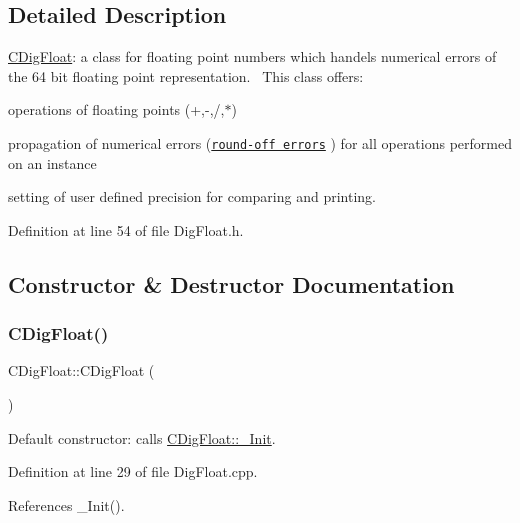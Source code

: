 \subsection{Detailed Description}
\hyperlink{classCDigFloat}{C\+Dig\+Float}\+: a class for floating point numbers which handels numerical errors of the 64 bit floating point representation.~\newline
 This class offers\+: 


\begin{DoxyItemize}
\item operations of floating points (+,-\/,/,$\ast$)
\item propagation of numerical errors (\href{https://en.wikipedia.org/wiki/Round-off_error}{\tt round-\/off errors} ) for all operations performed on an instance
\item setting of user defined precision for comparing and printing. 
\end{DoxyItemize}

Definition at line 54 of file Dig\+Float.\+h.



\subsection{Constructor \& Destructor Documentation}
\mbox{\label{classCDigFloat_ac16694fac9b3b0350f5d02888638ae20}} 
\subsubsection{\texorpdfstring{C\+Dig\+Float()}{CDigFloat()}\hspace{0.1cm}{\footnotesize\ttfamily [1/3]}}
{\footnotesize\ttfamily C\+Dig\+Float\+::\+C\+Dig\+Float (\begin{DoxyParamCaption}{ }\end{DoxyParamCaption})}



Default constructor\+: calls \hyperlink{classCDigFloat_a89a0dda21c74c115ac41b432031666a6}{C\+Dig\+Float\+::\+\_\+\+Init}. 



Definition at line 29 of file Dig\+Float.\+cpp.



References \+\_\+\+Init().

